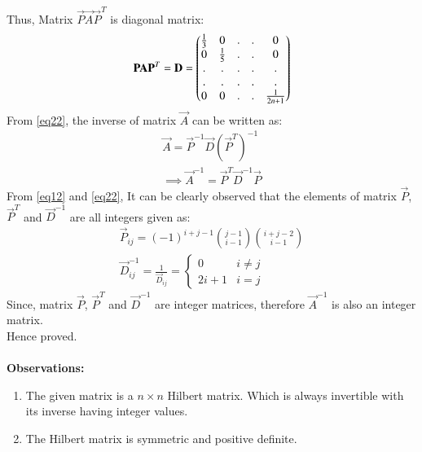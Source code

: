 \documentclass[journal,12pt,twocolumn]{IEEEtran}
\begin{document}
Thus, Matrix $\vec{P}\vec{A}\vec{P}^T$ is diagonal matrix:
\begin{align}
    \mathbf{P}\mathbf{A}\mathbf{P}^T=\mathbf{D}=\begin{pmatrix}\frac{1}{3} & 0 &.&.&0\\
    0 & \frac{1}{5} &.&.&0\\
    .&.&.&.&.\\.&.&.&.&.\\0 &0 &.&.&\frac{1}{2n+1}\end{pmatrix} \label{eq22}
\end{align}
From \eqref{eq22}, the inverse of matrix $\vec{A}$ can be written as:
\begin{align}
    \vec{A}=\vec{P}^{-1}\vec{D}(\vec{P}^T)^{-1}\\
    \implies \vec{A}^{-1}=\vec{P}^T\vec{D}^{-1}\vec{P}
\end{align}
From \eqref{eq12} and \eqref{eq22}, It can be clearly observed that the elements of matrix $\vec{P}$, $\vec{P}^T$ and $\vec{D}^{-1}$ are all integers given as:
\begin{align}
    \vec{P}_{ij}=(-1)^{i+j-1} {j-1 \choose i-1} {i+j-2 \choose i-1} \\
    \vec{D}^{-1}_{ij}=\frac{1}{\vec{D}_{ij}}=   \left\{\begin{matrix}
    0 & i\neq j\\ 
    2i+1 & i=j
    \end{matrix}\right.
\end{align}
Since, matrix $\vec{P}$, $\vec{P}^T$ and $\vec{D}^{-1}$ are integer matrices, therefore $\vec{A}^{-1}$ is also an integer matrix.\\
Hence proved.
\\ \\ 
\textbf{Observations:} 
\begin{enumerate}
    \item The given matrix is a $n\times n$ Hilbert matrix. Which is always invertible with its inverse having integer values.
    \item The Hilbert matrix is symmetric and positive definite.
\end{enumerate}
\end{document}
